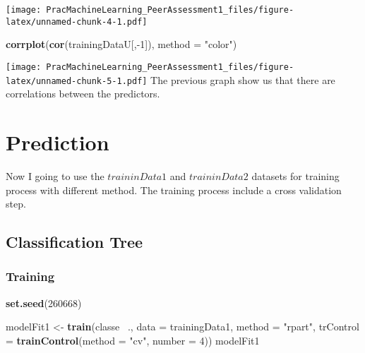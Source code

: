 \documentclass[]{article}
\newenvironment{Shaded}{\begin{snugshade}}{\end{snugshade}}
\newcommand{\KeywordTok}[1]{\textcolor[rgb]{0.13,0.29,0.53}{\textbf{{#1}}}}
\newcommand{\DataTypeTok}[1]{\textcolor[rgb]{0.13,0.29,0.53}{{#1}}}
\newcommand{\DecValTok}[1]{\textcolor[rgb]{0.00,0.00,0.81}{{#1}}}
\newcommand{\StringTok}[1]{\textcolor[rgb]{0.31,0.60,0.02}{{#1}}}
\newcommand{\NormalTok}[1]{{#1}}
\begin{document}
\begin{Shaded}
\end{Shaded}

\texttt{[image: PracMachineLearning\_PeerAssessment1\_files/figure-latex/unnamed-chunk-4-1.pdf]}

\begin{Shaded}
\begin{Highlighting}[]
\KeywordTok{corrplot}\NormalTok{(}\KeywordTok{cor}\NormalTok{(trainingDataU[,-}\DecValTok{1}\NormalTok{]), }\DataTypeTok{method =} \StringTok{"color"}\NormalTok{)}
\end{Highlighting}
\end{Shaded}

\texttt{[image: PracMachineLearning\_PeerAssessment1\_files/figure-latex/unnamed-chunk-5-1.pdf]}
The previous graph show us that there are correlations between the
predictors.

\section{Prediction}\label{prediction}

Now I going to use the \(traininData1\) and \(traininData2\) datasets
for training process with different method. The training process include
a cross validation step.

\subsection{Classification Tree}\label{classification-tree}

\subsubsection{Training}\label{training}

\begin{Shaded}
\begin{Highlighting}[]
\KeywordTok{set.seed}\NormalTok{(}\DecValTok{260668}\NormalTok{)}

\NormalTok{modelFit1 <-}\StringTok{ }\KeywordTok{train}\NormalTok{(classe ~., }\DataTypeTok{data =} \NormalTok{trainingData1,}
                  \DataTypeTok{method =} \StringTok{"rpart"}\NormalTok{,}
                  \DataTypeTok{trControl =} \KeywordTok{trainControl}\NormalTok{(}\DataTypeTok{method =} \StringTok{"cv"}\NormalTok{, }\DataTypeTok{number =} \DecValTok{4}\NormalTok{))}
\NormalTok{modelFit1}
\end{Highlighting}
\end{Shaded}
\end{document}
